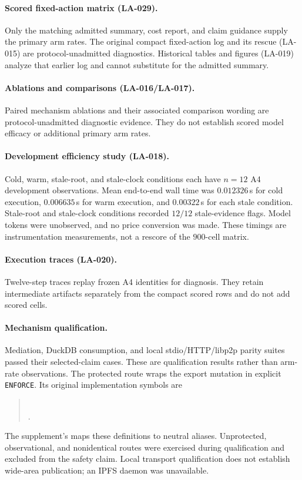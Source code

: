 \paragraph{Scored fixed-action matrix (LA-029).}
Only the matching admitted summary, cost report, and claim guidance supply the primary arm rates. The original compact fixed-action log and its rescue (LA-015) are protocol-unadmitted diagnostics. Historical tables and figures (LA-019) analyze that earlier log and cannot substitute for the admitted summary.

\paragraph{Ablations and comparisons (LA-016/LA-017).}
Paired mechanism ablations and their associated comparison wording are protocol-unadmitted diagnostic evidence. They do not establish scored model efficacy or additional primary arm rates.

\paragraph{Development efficiency study (LA-018).}
Cold, warm, stale-root, and stale-clock conditions each have $n=12$ A4 development observations. Mean end-to-end wall time was $0.012326$\,s for cold execution, $0.006635$\,s for warm execution, and $0.00322$\,s for each stale condition. Stale-root and stale-clock conditions recorded $12/12$ stale-evidence flags. Model tokens were unobserved, and no price conversion was made. These timings are instrumentation measurements, not a rescore of the $900$-cell matrix.

\paragraph{Execution traces (LA-020).}
Twelve-step traces replay frozen A4 identities for diagnosis. They retain intermediate artifacts separately from the compact scored rows and do not add scored cells.

\paragraph{Mechanism qualification.}
Mediation, DuckDB consumption, and local stdio/HTTP/libp2p parity suites passed their selected-claim cases. These are qualification results rather than arm-rate observations. The protected route wraps the export mutation in explicit \texttt{ENFORCE}. Its original implementation symbols are
\begin{quote}\raggedright\small
{}\\[2pt]
.
\end{quote}
The supplement's  maps these definitions to neutral aliases.
Unprotected, observational, and nonidentical routes were exercised during qualification and excluded from the safety claim. Local transport qualification does not establish wide-area publication; an IPFS daemon was unavailable.

